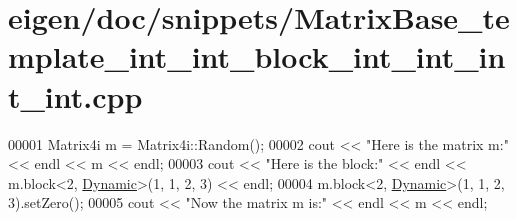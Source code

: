 \hypertarget{eigen_2doc_2snippets_2_matrix_base__template__int__int__block__int__int__int__int_8cpp_source}{}\section{eigen/doc/snippets/\+Matrix\+Base\+\_\+template\+\_\+int\+\_\+int\+\_\+block\+\_\+int\+\_\+int\+\_\+int\+\_\+int.cpp}
\label{eigen_2doc_2snippets_2_matrix_base__template__int__int__block__int__int__int__int_8cpp_source}

\begin{DoxyCode}
00001 Matrix4i m = Matrix4i::Random();
00002 cout << \textcolor{stringliteral}{"Here is the matrix m:"} << endl << m << endl;
00003 cout << \textcolor{stringliteral}{"Here is the block:"} << endl << m.block<2, \hyperlink{namespace_eigen_ad81fa7195215a0ce30017dfac309f0b2}{Dynamic}>(1, 1, 2, 3) << endl;
00004 m.block<2, \hyperlink{namespace_eigen_ad81fa7195215a0ce30017dfac309f0b2}{Dynamic}>(1, 1, 2, 3).setZero();
00005 cout << \textcolor{stringliteral}{"Now the matrix m is:"} << endl << m << endl;
\end{DoxyCode}
